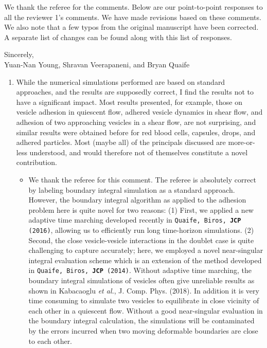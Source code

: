 \documentclass[11pt]{article}
\newcommand{\comment}[1]{{\color{blue} #1}}
\begin{document}
\noindent
We thank the referee for the comments.  Below are our point-to-point responses to 
all the reviewer 1's comments.  We have made revisions based on these comments.
We also note that a few typos from the original manuscript have
been corrected.  A separate list of changes can be found along with this list of responses.


\noindent 
Sincerely, \\ \noindent
Yuan-Nan Young, Shravan Veerapaneni, and Bryan Quaife

\vspace{20pt}
\noindent

\begin{enumerate}
\item\comment{While the numerical simulations performed are based on standard
approaches, and the results are supposedly correct, I find the results
not to have a significant impact. Most results presented, for example,
those on vesicle adhesion in quiescent flow, adhered vesicle dynamics in
shear flow, and adhesion of two approaching vesicles in a shear flow,
are not surprising, and similar results were obtained before for red
blood cells, capsules, drops, and adhered particles. Most (maybe all) of
the principals discussed are more-or-less understood, and would
therefore not of themselves constitute a novel contribution.}
\begin{itemize}
  \item We thank the referee for this comment. The referee is absolutely correct by labeling boundary integral simulation as a standard approach. However, the boundary integral algorithm as applied to the adhesion problem here is quite novel for two reasons: (1) First, we applied a new adaptive time marching developed recently in \texttt{Quaife, Biros, \textbf{JCP} (2016)}, allowing us to efficiently run long time-horizon simulations. (2) Second, the close vesicle-vesicle interactions in the doublet case is quite challenging to capture accurately; here, we employed a novel near-singular integral evaluation scheme which is an extension of the method developed in  \texttt{Quaife, Biros, \textbf{JCP} (2014)}. Without adaptive time marching, the boundary integral simulations of vesicles often give unreliable results as shown in
Kabacaoglu {\it et al.}, J. Comp. Phys. (2018). In addition it is very time consuming to simulate two vesicles to equilibrate in close vicinity of each other in a quiescent flow. 
Without a good near-singular evaluation in the boundary integral calculation, the simulations will be contaminated by the errors incurred when two moving deformable boundaries are close to each other.
  

\end{itemize}
\end{enumerate}
\end{document}
